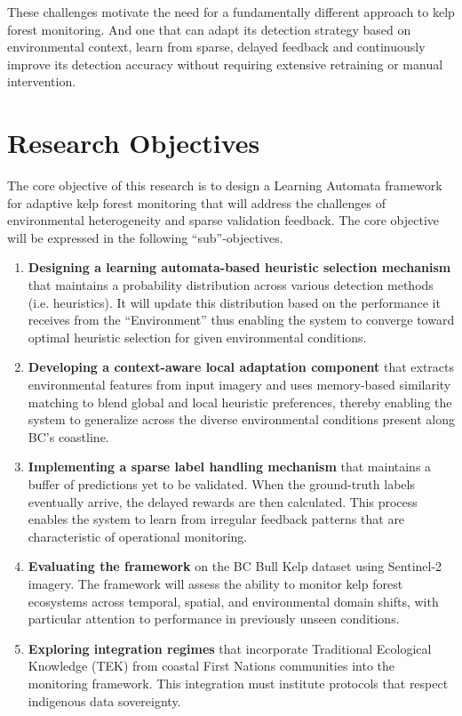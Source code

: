 \documentclass[12pt,oneside]{book}
\begin{document}
These challenges motivate the need for a fundamentally different approach to kelp forest monitoring. And one that can adapt its detection strategy based on environmental context, learn from sparse, delayed feedback and continuously improve its detection accuracy without requiring extensive retraining or manual intervention.

\section{Research Objectives}
\label{sec:objectives}

The core objective of this research is to design a Learning Automata framework for adaptive kelp forest monitoring that will address the challenges of environmental heterogeneity and sparse validation feedback. The core objective will be expressed in the following ``sub''-objectives.

\begin{enumerate}
    \item \textbf{Designing a learning automata-based heuristic selection mechanism} that maintains a probability distribution across various detection methods (i.e. heuristics). It will update this distribution based on the performance it receives from the ``Environment'' thus enabling the system to converge toward optimal heuristic selection for given environmental conditions.

    \item \textbf{Developing a context-aware local adaptation component} that extracts environmental features from input imagery and uses memory-based similarity matching to blend global and local heuristic preferences, thereby enabling the system to generalize across the diverse environmental conditions present along BC's coastline.

    \item \textbf{Implementing a sparse label handling mechanism} that maintains a buffer of predictions yet to be validated. When the ground-truth labels eventually arrive, the delayed rewards are then calculated. This process enables the system to learn from irregular feedback patterns that are characteristic of operational monitoring.

    \item \textbf{Evaluating the framework} on the BC Bull Kelp dataset using Sentinel-2 imagery. The framework will assess the ability to monitor kelp forest ecosystems across temporal, spatial, and environmental domain shifts, with particular attention to performance in previously unseen conditions.

    \item \textbf{Exploring integration regimes} that incorporate Traditional Ecological Knowledge (TEK) from coastal First Nations communities into the monitoring framework. This integration must institute protocols that respect indigenous data sovereignty.
\end{enumerate}
\end{document}
